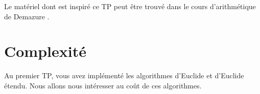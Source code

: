 Le matériel dont est inspiré ce TP peut être trouvé dans le cours d'arithmétique de Demazure \cite{demazure}.\\

\section{Complexité}

Au premier TP, vous avez implémenté les algorithmes d'Euclide et d'Euclide étendu. 
Nous allons nous intéresser au coût de ces algorithmes.

